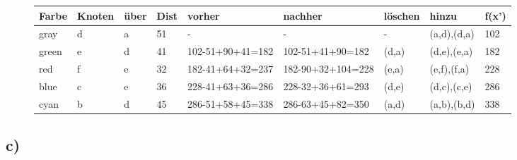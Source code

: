 \documentclass[12pt]{article}
\begin{document}
	\begin{figure}[H]
		\centering
		\begin{tabular}{l | l | l|l|l|l|l|l|l}
			Farbe & Knoten & über & Dist & vorher & nachher &löschen & hinzu & f(x') \\ \hline
			\color{gray}gray & d & a & 51 & - & - & - & (a,d),(d,a) & 102 \\
			\color{green}green & e & d & 41 & 102-51+90+41=182 & 102-51+41+90=182 & (d,a) & (d,e),(e,a) & 182 \\
			\color{red}red & f & e & 32 & 182-41+64+32=237 & 182-90+32+104=228 & (e,a) & (e,f),(f,a) & 228 \\
			\color{blue}blue & c & e & 36 & 228-41+63+36=286 & 228-32+36+61=293 & (d,e) & (d,c),(c,e) & 286 \\
			\color{cyan}cyan & b & d & 45 & 286-51+58+45=338 & 286-63+45+82=350 & (a,d) & (a,b),(b,d) & 338\\
		\end{tabular}
	\end{figure}
	
	
	\subsection{c)}
	
\end{document}

